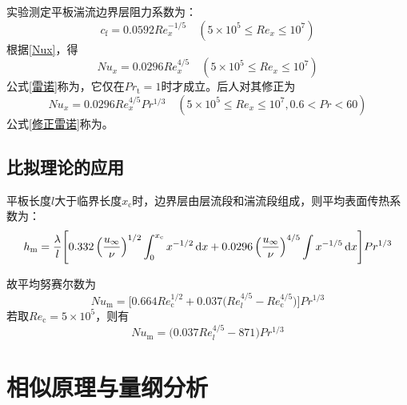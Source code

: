 实验测定平板湍流边界层阻力系数为：
\begin{equation}
	c_\text{f} = 0.0592Re_x^{-1/5} \quad (5\times 10^5 \le Re_x \le 10^7)
\end{equation}
根据\eqref{Nux}，得
\begin{equation}
	Nu_x = 0.0296Re_x^{4/5} \quad (5\times 10^5 \le Re_x \le 10^7)
	\label{雷诺}
\end{equation}
公式\eqref{雷诺}称为，它仅在$Pr_\text{t} = 1$时才成立。后人对其修正为
\begin{equation}
	Nu_x = 0.0296Re_x^{4/5}Pr^{1/3} \quad (5\times 10^5 \le Re_x \le 10^7,0.6<Pr<60)
	\label{修正雷诺}
\end{equation}
公式\eqref{修正雷诺}称为。
\vspace*{0.5em}

\subsection{比拟理论的应用}
平板长度$l$大于临界长度$x_\text{c}$时，边界层由层流段和湍流段组成，则平均表面传热系数为：
\begin{equation}
	h_\text{m} = \dfrac{\lambda}{l}\Bigg[0.332\left(\dfrac{u_\infty}{\nu}\right)^{1/2}\int_0^{x_\text{c}}x^{-1/2}\, {\rm{d}} x + 0.0296 \left(\dfrac{u_\infty}{\nu}\right)^{4/5}\int x^{-1/5}\, {\rm{d}} x\Bigg]Pr^{1/3}
\end{equation}

故平均努赛尔数为
\begin{equation}
	Nu_\text{m} = \bigg[0.664Re_{\text{c}}^{1/2} + 0.037\big(Re_l^{4/5}-Re_\text{c}^{4/5}\big)\bigg]Pr^{1/3}
\end{equation}
若取$Re_\text{c} = 5 \times 10^5$，则有
\begin{equation}
	Nu_\text{m} = \big(0.037Re_l^{4/5} - 871\big)Pr^{1/3}
\end{equation}


\section{相似原理与量纲分析}



























